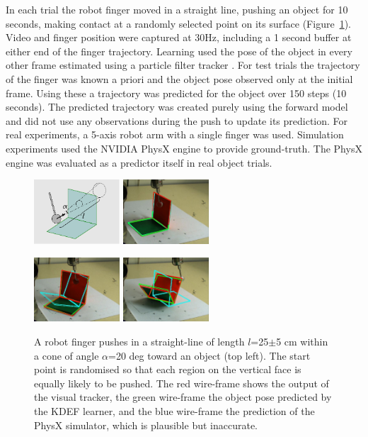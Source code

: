 In each trial the robot finger moved in a straight line, pushing
an object for 10 seconds, making contact at a randomly selected point
on its surface (Figure~\ref{fig:Setup}). Video and finger position were captured at 30Hz, including a 1 second buffer at either end of the finger trajectory. Learning used the pose of the object in every other frame estimated using a particle filter tracker \cite{morwald_edge_2009}. For test trials the trajectory of the finger was known a priori and the object pose observed only at the initial frame. Using these a trajectory was predicted for the object over 150 steps (10 seconds). The predicted trajectory was created purely using the forward model and did not use any observations during the push to update its prediction. For real experiments, a 5-axis robot arm with a single finger was used. Simulation experiments used the NVIDIA PhysX engine to provide ground-truth. The PhysX engine was evaluated as a predictor itself in real object trials.

\begin{figure}[t]
\centerline{
\includegraphics[width=3.2cm]{training}
\includegraphics[width=3.2cm]{complex1}
}
\centerline{
\includegraphics[width=3.2cm]{complex2}
\includegraphics[width=3.2cm]{complex4}
}
\caption[Setup]{
A robot finger pushes in a straight-line of length $l$=25$\pm$5 cm within a cone of angle $\alpha$=20 deg toward an object (top left). The start point is randomised so that each region on the vertical face is equally likely to be pushed. The red wire-frame shows the output of the visual tracker, the green wire-frame the object pose predicted by the KDEF learner, and the blue wire-frame the prediction of the PhysX simulator, which is plausible but inaccurate.}
\label{fig:Setup}
\end{figure}

